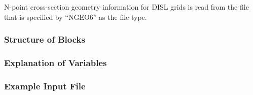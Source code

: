 N-point cross-section geometry information for DISL grids is read from the file that is specified by ``NGEO6'' as the file type.  

\vspace{5mm}
\subsubsection{Structure of Blocks}




\vspace{5mm}
\subsubsection{Explanation of Variables}
\begin{description}

\end{description}

\vspace{5mm}
\subsubsection{Example Input File}

